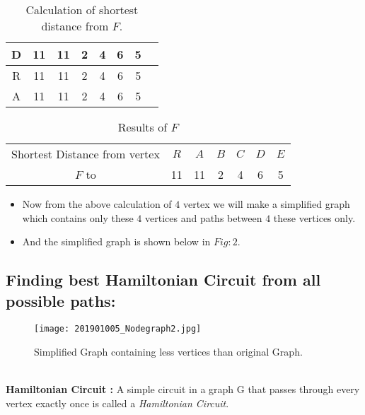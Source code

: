 \documentclass{article}
\begin{document}
\begin{enumerate}
\begin{table}[h]
\begin{tabular}{|C|c|c|c|c|c|c|c|}
                \hline
                D & 11 & 11 & 2 & 4 & 6 & 5 \\
                \hline
                R & 11 & 11 & 2 & 4 & 6 & 5 \\
                \hline 
                A & 11 & 11 & 2 & 4 & 6 & 5 \\
                \hline
               \end{tabular}
               \caption{Calculation of shortest distance from $F$.}
               \label{tab:my_label}
           \end{table} 
           \begin{table}[h!]
               \centering
               \begin{tabular}{|c|c|c|c|c|c|c|}
               \hline
                   Shortest Distance from vertex & $R$ & $A$ & $B$ & $C$ & $D$ & $E$ \\
                   $F$ to & 11 & 11 & 2 & 4 & 6 & 5 \\
               \hline
               \end{tabular}
               \caption{Results of $F$}
               \label{tab:my_label}
           \end{table}
          \begin{itemize}
              \item Now from the above calculation of $4$ vertex we will make a simplified graph which contains only these $4$ vertices and paths between $4$ these vertices only.
              \item And the simplified graph is shown below in $Fig:2$.
          \end{itemize}
          \citep{key1}
        \end{enumerate}
        \newpage
       
    \subsection{Finding best Hamiltonian Circuit from all possible paths:}
    \begin{figure}[h]
        \centering
        \texttt{[image: 201901005\_Nodegraph2.jpg]}
        \caption{Simplified Graph containing less vertices than original Graph.}
        \label{fig:Nodegraph2}
    \end{figure}\\
    \textbf{Hamiltonian Circuit :} A simple circuit in a graph G that passes through every vertex exactly once is called a \textit{Hamiltonian Circuit}.\\
    
\end{document}
